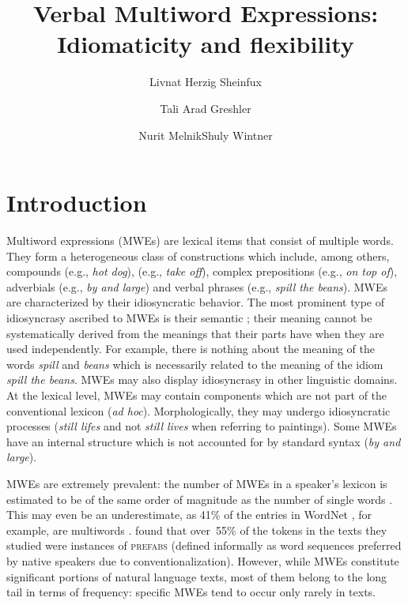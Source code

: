\documentclass[output=paper]{langsci/langscibook}
\title{Verbal Multiword Expressions: Idiomaticity and flexibility}
\author{Livnat Herzig Sheinfux\affiliation{University of Haifa}\and Tali Arad Greshler\affiliation{University of Haifa}\and Nurit Melnik\affiliation{The Open University of Israel}\lastand Shuly Wintner\affiliation{University of Haifa}}
\begin{document}

\section{Introduction}
\label{she:sec:introduction}

Multiword expressions (MWEs) are lexical items that consist of
multiple words. They form a heterogeneous class of
constructions which include, among others, compounds (e.g., \textit{hot
  dog}),  (e.g., \textit{take off}), complex
prepositions (e.g., \textit{on top of}), adverbials (e.g., \textit{by and large})
and verbal phrases (e.g., \textit{spill the beans}). MWEs are characterized
by their idiosyncratic behavior. The most prominent type of
idiosyncrasy ascribed to MWEs is their semantic ; their
meaning cannot be systematically derived from the meanings that their
parts have when they are used independently.
For example, there is nothing about the meaning of the words \textit{spill} and \textit{beans} which is necessarily related to the meaning of the idiom \textit{spill the beans}.
MWEs may also display idiosyncrasy in other linguistic
domains. At the lexical level, MWEs may contain components which are
not part of the conventional lexicon (\textit{ad
  hoc}). Morphologically, they may undergo idiosyncratic processes
(\textit{still lifes} and not \textit{still lives} when referring to
paintings). Some MWEs have an internal structure which is not
accounted for by standard syntax (\textit{by and large}).

MWEs are extremely prevalent: the number of MWEs in a speaker's
lexicon is estimated to be of the same order of magnitude as the
number of single words \citep{jackendoff1997architecture}. This may even be an
underestimate, as 41\% of the entries in WordNet \citep{wordnet}, for
example, are multiwords \citep{sag02}.
\citet{erman:warren:2000} found that over~55\% of the tokens in the
texts they studied were instances of {\scshape prefabs} (defined
informally as word sequences preferred by native speakers due to
conventionalization).  However, while MWEs constitute significant
portions of natural language texts, most of them belong to the long
tail in terms of frequency: specific MWEs tend to occur only rarely in
texts.
\end{document}
